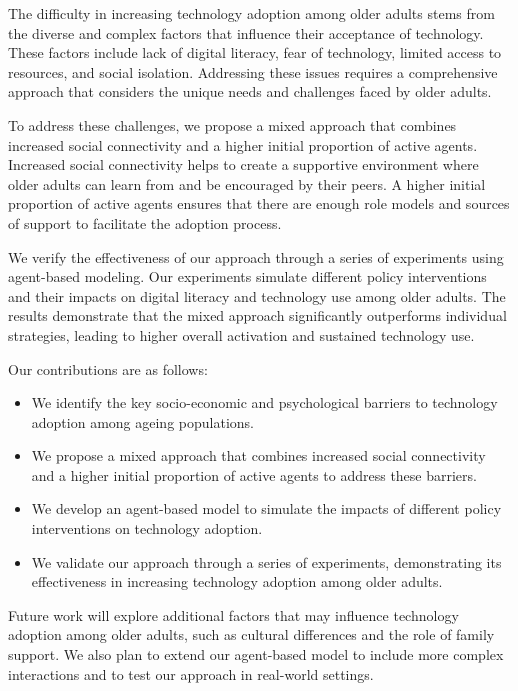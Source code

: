 \documentclass{article} %
\begin{document}
The difficulty in increasing technology adoption among older adults stems from the diverse and complex factors that influence their acceptance of technology. These factors include lack of digital literacy, fear of technology, limited access to resources, and social isolation. Addressing these issues requires a comprehensive approach that considers the unique needs and challenges faced by older adults.

To address these challenges, we propose a mixed approach that combines increased social connectivity and a higher initial proportion of active agents. Increased social connectivity helps to create a supportive environment where older adults can learn from and be encouraged by their peers. A higher initial proportion of active agents ensures that there are enough role models and sources of support to facilitate the adoption process.

We verify the effectiveness of our approach through a series of experiments using agent-based modeling. Our experiments simulate different policy interventions and their impacts on digital literacy and technology use among older adults. The results demonstrate that the mixed approach significantly outperforms individual strategies, leading to higher overall activation and sustained technology use.

Our contributions are as follows:
\begin{itemize}
    \item We identify the key socio-economic and psychological barriers to technology adoption among ageing populations.
    \item We propose a mixed approach that combines increased social connectivity and a higher initial proportion of active agents to address these barriers.
    \item We develop an agent-based model to simulate the impacts of different policy interventions on technology adoption.
    \item We validate our approach through a series of experiments, demonstrating its effectiveness in increasing technology adoption among older adults.
\end{itemize}

Future work will explore additional factors that may influence technology adoption among older adults, such as cultural differences and the role of family support. We also plan to extend our agent-based model to include more complex interactions and to test our approach in real-world settings.
\end{document}
